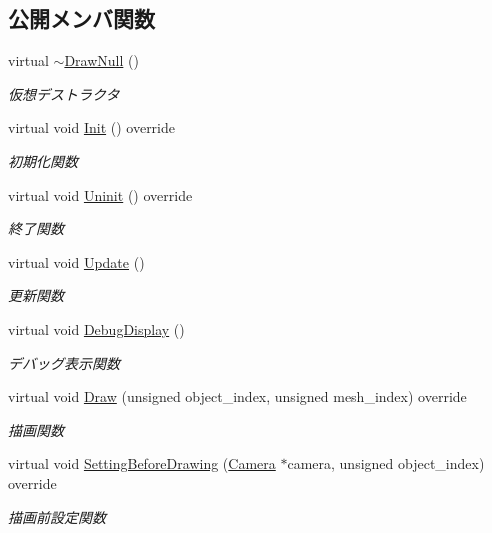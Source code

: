 \subsection*{公開メンバ関数}
\begin{DoxyCompactItemize}
\item 
virtual \mbox{\hyperlink{class_draw_null_aa085e175e9e05fc56cb4aefa2d07f371}{$\sim$\+Draw\+Null}} ()
\begin{DoxyCompactList}\small\item\em 仮想デストラクタ \end{DoxyCompactList}\item 
virtual void \mbox{\hyperlink{class_draw_null_acd7fef3ccea1da537ac9507ffbb6dd2e}{Init}} () override
\begin{DoxyCompactList}\small\item\em 初期化関数 \end{DoxyCompactList}\item 
virtual void \mbox{\hyperlink{class_draw_null_a12d44e341c7364b5ab9cdd661dc16187}{Uninit}} () override
\begin{DoxyCompactList}\small\item\em 終了関数 \end{DoxyCompactList}\item 
virtual void \mbox{\hyperlink{class_draw_null_a0149bcf84a34b138642ab7975ae46f30}{Update}} ()
\begin{DoxyCompactList}\small\item\em 更新関数 \end{DoxyCompactList}\item 
virtual void \mbox{\hyperlink{class_draw_null_a2921257342eca07c8f6db4c475959f77}{Debug\+Display}} ()
\begin{DoxyCompactList}\small\item\em デバッグ表示関数 \end{DoxyCompactList}\item 
virtual void \mbox{\hyperlink{class_draw_null_afe50f6fd820b18d673f70f048743f339}{Draw}} (unsigned object\+\_\+index, unsigned mesh\+\_\+index) override
\begin{DoxyCompactList}\small\item\em 描画関数 \end{DoxyCompactList}\item 
virtual void \mbox{\hyperlink{class_draw_null_a7f0d52c5c2fb2d9b8eb423f363862290}{Setting\+Before\+Drawing}} (\mbox{\hyperlink{class_camera}{Camera}} $\ast$camera, unsigned object\+\_\+index) override
\begin{DoxyCompactList}\small\item\em 描画前設定関数 \end{DoxyCompactList}\item 

\end{DoxyCompactItemize}
